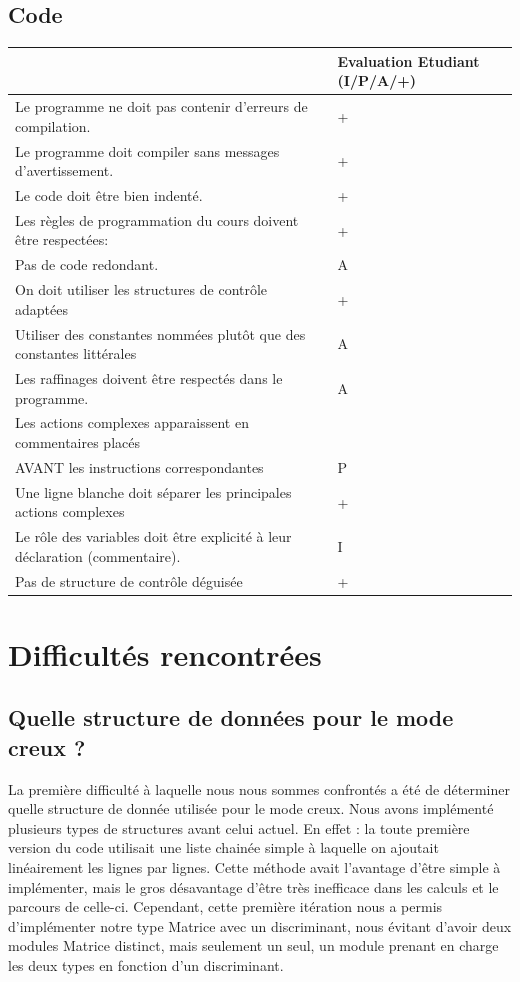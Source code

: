 \documentclass{NewTeX}
\begin{document}
\subsection{Code}

\begin{table}[H]
    \centering
    \begin{tabular}{|l|l|}
    \hline
        ~ & Evaluation Etudiant (I/P/A/+) \\ \hline
        Le programme ne doit pas contenir d'erreurs de compilation.  & + \\ \hline
        Le programme doit compiler sans messages d'avertissement. & + \\ \hline
        Le code doit être bien indenté. & + \\ \hline
        Les règles de programmation du cours doivent être respectées: & + \\ \hline
        Pas de code redondant. & A \\ \hline
        On doit utiliser les structures de contrôle adaptées & + \\ \hline
        Utiliser des constantes nommées plutôt que des constantes littérales & A \\ \hline
        Les raffinages doivent être respectés dans le programme. & A \\ \hline
        Les actions complexes apparaissent en commentaires placés & \\ AVANT les instructions correspondantes & P \\ \hline
        Une ligne blanche doit séparer les principales actions complexes & + \\ \hline
        Le rôle des variables doit être explicité à leur déclaration (commentaire). & I \\ \hline
        Pas de structure de contrôle déguisée & + \\ \hline
    \end{tabular}
\end{table}


\section{Difficultés rencontrées}

\subsection{Quelle structure de données pour le mode creux ?}

La première difficulté à laquelle nous nous sommes confrontés a été de déterminer quelle structure de donnée utilisée pour le mode creux. Nous avons implémenté plusieurs types de structures avant celui actuel. En effet : la toute première version du code  utilisait une liste chainée simple à laquelle on ajoutait linéairement les lignes par lignes. Cette méthode avait l'avantage d'être simple à implémenter, mais le gros désavantage d'être très inefficace dans les calculs et le parcours de celle-ci. Cependant, cette première itération nous a permis d'implémenter notre type Matrice avec un discriminant, nous évitant d'avoir deux modules Matrice distinct, mais seulement un seul, un module prenant en charge les deux types en fonction d'un discriminant.
\end{document}
